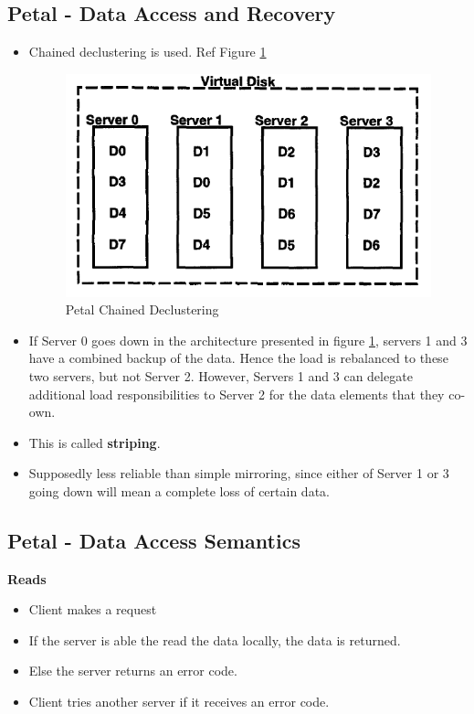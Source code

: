 \documentclass[parskip=half]{scrartcl}
\begin{document}

    \subsection{Petal - Data Access and Recovery} %
    \label{sub:petal_data_access_and_recovery}

        \begin{itemize}
            \item 
            Chained declustering is used. Ref Figure \ref{fig:petal-chained-declustering}
            \begin{figure}[ht]
                \centering
                \includegraphics[width=.4\textwidth]{petal-chained-declustering}
                \caption{Petal Chained Declustering}
                \label{fig:petal-chained-declustering}
            \end{figure}
            \item 
            If Server 0 goes down in the architecture presented in figure \ref{fig:petal-chained-declustering}, servers 1 and 3 have a combined backup of the data. Hence the load is rebalanced to these two servers, but not Server 2. However, Servers 1 and 3 can delegate additional load responsibilities to Server 2 for the data elements that they co-own.
            \item 
            This is called \textbf{striping}.
            \item 
            Supposedly less reliable than simple mirroring, since either of Server 1 or 3 going down will mean a complete loss of certain data.
        \end{itemize}
    

    \subsection{Petal - Data Access Semantics} %
    \label{sub:petal_data_access_semantics}

        \textbf{Reads}
        \begin{itemize}
            \item 
            Client makes a request
            \item 
            If the server is able the read the data locally, the data is returned.
            \item 
            Else the server returns an error code.
            \item 
            Client tries another server if it receives an error code.
        \end{itemize}
\end{document}
